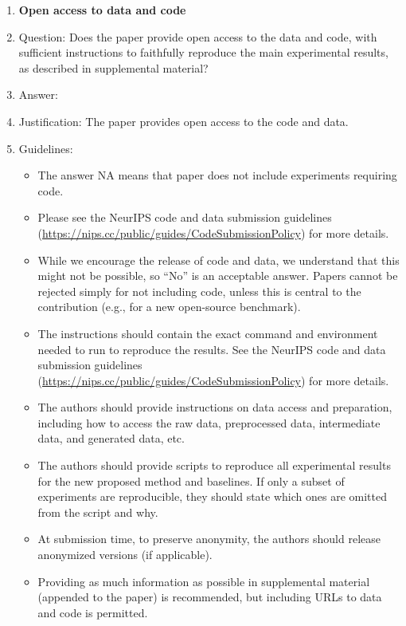 \documentclass[letterpaper]{article}
\begin{document}
\begin{enumerate}
\item {\bf Open access to data and code}
    \item[] Question: Does the paper provide open access to the data and code, with sufficient instructions to faithfully reproduce the main experimental results, as described in supplemental material?
    \item[] Answer: \answerYes{} %
    \item[] Justification: The paper provides open access to the code and data.
    \item[] Guidelines:
    \begin{itemize}
        \item The answer NA means that paper does not include experiments requiring code.
        \item Please see the NeurIPS code and data submission guidelines (\url{https://nips.cc/public/guides/CodeSubmissionPolicy}) for more details.
        \item While we encourage the release of code and data, we understand that this might not be possible, so “No” is an acceptable answer. Papers cannot be rejected simply for not including code, unless this is central to the contribution (e.g., for a new open-source benchmark).
        \item The instructions should contain the exact command and environment needed to run to reproduce the results. See the NeurIPS code and data submission guidelines (\url{https://nips.cc/public/guides/CodeSubmissionPolicy}) for more details.
        \item The authors should provide instructions on data access and preparation, including how to access the raw data, preprocessed data, intermediate data, and generated data, etc.
        \item The authors should provide scripts to reproduce all experimental results for the new proposed method and baselines. If only a subset of experiments are reproducible, they should state which ones are omitted from the script and why.
        \item At submission time, to preserve anonymity, the authors should release anonymized versions (if applicable).
        \item Providing as much information as possible in supplemental material (appended to the paper) is recommended, but including URLs to data and code is permitted.
    \end{itemize}



\end{enumerate}
\end{document}
